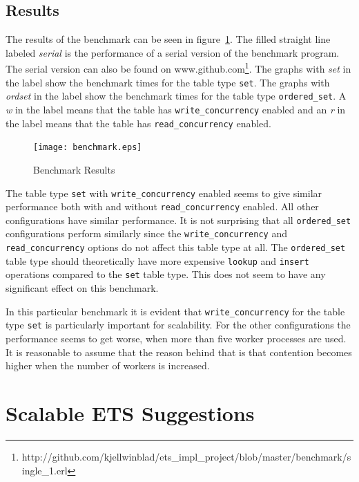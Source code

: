 \documentclass[aps,pre,preprint,nofootinbib]{revtex4}
\begin{document}
\subsection{Results}

  The results of the benchmark can be seen in figure~\ref{fig:benchmark_results}.
  The filled straight line labeled \emph{serial} is the performance of a serial version of the benchmark program.
  The serial version can also be found on www.github.com\footnote{http://github.com/kjellwinblad/ets\_impl\_project/blob/master/benchmark/single\_1.erl}.
  The graphs with \emph{set} in the label show the benchmark times for the table type \verb|set|.
  The graphs with \emph{ordset} in the label show the benchmark times for the table type \verb|ordered_set|.
  A \emph{w} in the label means that the table has \verb|write_concurrency| enabled and an \emph{r} in the label means that the table has \verb|read_concurrency| enabled.


\begin{figure}[htb]
\centering
\texttt{[image: benchmark.eps]}
\caption{Benchmark Results}
\label{fig:benchmark_results}
\end{figure}

  The table type \verb|set| with \verb|write_concurrency| enabled seems to give similar performance both with and without \verb|read_concurrency| enabled.
  All other configurations have similar performance.
  It is not surprising that all \verb|ordered_set| configurations perform similarly since the \verb|write_concurrency| and \verb|read_concurrency| options do not affect this table type at all.
  The \verb|ordered_set| table type should theoretically have more expensive \verb|lookup| and \verb|insert| operations compared to the \verb|set| table type.
  This does not seem to have any significant effect on this benchmark.

  In this particular benchmark it is evident that \verb|write_concurrency| for the table type \verb|set| is particularly important for scalability.
  For the other configurations the performance seems to get worse, when more than five worker processes are used.
  It is reasonable to assume that the reason behind that is that contention becomes higher when the number of workers is increased.



\section{Scalable ETS Suggestions}
\end{document}
